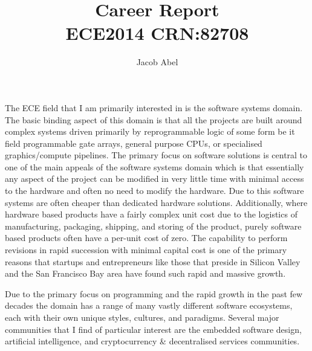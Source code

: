 \documentclass[12pt,letterpaper,titlepage]{report}
\author{Jacob Abel}
\title{%
	Career Report
	\\\large ECE2014 CRN:82708
}
\begin{document}
\maketitle
\begin{raggedright}
\setlength{\parindent}{.5cm}

The ECE field that I am primarily interested in is the software systems domain. The basic binding aspect of this domain is that all the projects are built around complex systems driven primarily by reprogrammable logic of some form be it field programmable gate arrays, general purpose CPUs, or specialised graphics/compute pipelines. The primary focus on software solutions is central to one of the main appeals of the software systems domain which is that essentially any aspect of the project can be modified in very little time with minimal access to the hardware and often no need to modify the hardware. Due to this software systems are often cheaper than dedicated hardware solutions. Additionally, where hardware based products have a fairly complex unit cost due to the logistics of manufacturing, packaging, shipping, and storing of the product, purely software based products often have a per-unit cost of zero. The capability to perform revisions in rapid succession with minimal capital cost is one of the primary reasons that startups and entrepreneurs like those that preside in Silicon Valley and the San Francisco Bay area have found such rapid and massive growth.

Due to the primary focus on programming and the rapid growth in the past few decades the domain has a range of many vastly different software ecosystems, each with their own unique styles, cultures, and paradigms. Several major communities that I find of particular interest are the embedded software design, artificial intelligence, and cryptocurrency \& decentralised services communities.


\end{raggedright}
\end{document}
